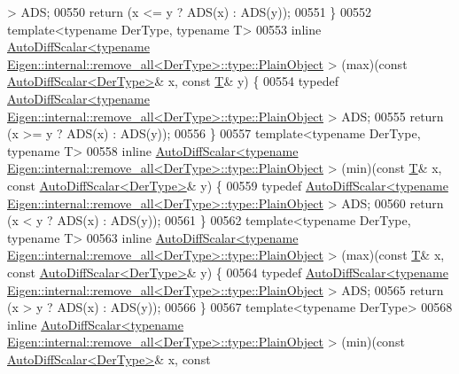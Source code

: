 \begin{DoxyCode}
      > ADS;
00550   \textcolor{keywordflow}{return} (x <= y ? ADS(x) : ADS(y));
00551 \}
00552 \textcolor{keyword}{template}<\textcolor{keyword}{typename} DerType, \textcolor{keyword}{typename} T>
00553 \textcolor{keyword}{inline} 
      \hyperlink{class_eigen_1_1_auto_diff_scalar}{AutoDiffScalar<typename Eigen::internal::remove\_all<DerType>::type::PlainObject}
      > (max)(\textcolor{keyword}{const} \hyperlink{class_eigen_1_1_auto_diff_scalar}{AutoDiffScalar<DerType>}& x, \textcolor{keyword}{const} \hyperlink{group___sparse_core___module}{T}& y) \{
00554   \textcolor{keyword}{typedef} 
      \hyperlink{class_eigen_1_1_auto_diff_scalar}{AutoDiffScalar<typename Eigen::internal::remove\_all<DerType>::type::PlainObject}
      > ADS;
00555   \textcolor{keywordflow}{return} (x >= y ? ADS(x) : ADS(y));
00556 \}
00557 \textcolor{keyword}{template}<\textcolor{keyword}{typename} DerType, \textcolor{keyword}{typename} T>
00558 \textcolor{keyword}{inline} 
      \hyperlink{class_eigen_1_1_auto_diff_scalar}{AutoDiffScalar<typename Eigen::internal::remove\_all<DerType>::type::PlainObject}
      > (min)(\textcolor{keyword}{const} \hyperlink{group___sparse_core___module}{T}& x, \textcolor{keyword}{const} \hyperlink{class_eigen_1_1_auto_diff_scalar}{AutoDiffScalar<DerType>}& y) \{
00559   \textcolor{keyword}{typedef} 
      \hyperlink{class_eigen_1_1_auto_diff_scalar}{AutoDiffScalar<typename Eigen::internal::remove\_all<DerType>::type::PlainObject}
      > ADS;
00560   \textcolor{keywordflow}{return} (x < y ? ADS(x) : ADS(y));
00561 \}
00562 \textcolor{keyword}{template}<\textcolor{keyword}{typename} DerType, \textcolor{keyword}{typename} T>
00563 \textcolor{keyword}{inline} 
      \hyperlink{class_eigen_1_1_auto_diff_scalar}{AutoDiffScalar<typename Eigen::internal::remove\_all<DerType>::type::PlainObject}
      > (max)(\textcolor{keyword}{const} \hyperlink{group___sparse_core___module}{T}& x, \textcolor{keyword}{const} \hyperlink{class_eigen_1_1_auto_diff_scalar}{AutoDiffScalar<DerType>}& y) \{
00564   \textcolor{keyword}{typedef} 
      \hyperlink{class_eigen_1_1_auto_diff_scalar}{AutoDiffScalar<typename Eigen::internal::remove\_all<DerType>::type::PlainObject}
      > ADS;
00565   \textcolor{keywordflow}{return} (x > y ? ADS(x) : ADS(y));
00566 \}
00567 \textcolor{keyword}{template}<\textcolor{keyword}{typename} DerType>
00568 \textcolor{keyword}{inline} 
      \hyperlink{class_eigen_1_1_auto_diff_scalar}{AutoDiffScalar<typename Eigen::internal::remove\_all<DerType>::type::PlainObject}
      > (min)(\textcolor{keyword}{const} \hyperlink{class_eigen_1_1_auto_diff_scalar}{AutoDiffScalar<DerType>}& x, \textcolor{keyword}{const} 

\end{DoxyCode}
